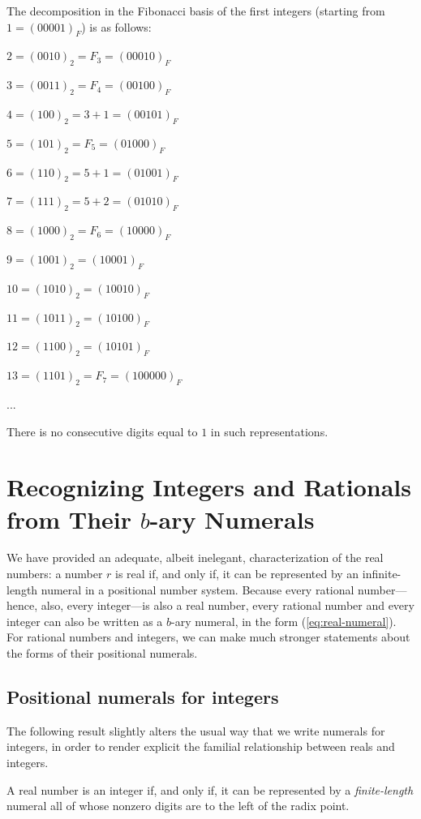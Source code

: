 The decomposition in the Fibonacci basis of the first integers (starting from $1 = (00001)_F$) is as follows:

 $2 = (0010)_2 = F_3 = (00010)_F$
 
 $3 = (0011)_2 = F_4 = (00100)_F$
  
 $4 = (100)_2 = 3+1 = (00101)_F$
 
 $5 = (101)_2 = F_5 = (01000)_F$
 
 $6 = (110)_2 = 5+1 = (01001)_F$
 
 $7 = (111)_2 = 5+2 = (01010)_F$
 
 $8 = (1000)_2 = F_6 = (10000)_F$
 
 $9 = (1001)_2 = (10001)_F$
 
 $10 = (1010)_2 = (10010)_F$
 
 $11 = (1011)_2 = (10100)_F$
 
 $12 = (1100)_2 = (10101)_F$
 
 $13 = (1101)_2 = F_7 =(100000)_F$
 
 ...
 
There is no consecutive digits equal to $1$ in such representations.


\section{Recognizing Integers and  Rationals from Their $b$-ary Numerals}
\label{sec:special-numerals-N-Q}

We have provided an adequate, albeit inelegant, characterization of
the real numbers: a number $r$ is real if, and only if, it can be
represented by an infinite-length numeral in a positional number
system.  Because every rational number---hence, also, every
integer---is also a real number, every rational number and every
integer can also be written as a $b$-ary numeral, in the form
(\ref{eq:real-numeral}).  For rational numbers and integers, we can
make much stronger statements about the forms of their positional
numerals.


\subsection{Positional numerals for integers}
\label{sec:special-numerals-N}

The following result slightly alters the usual way that we write
numerals for integers, in order to render explicit the familial
relationship between reals and integers.

\begin{prop}
\label{thm:integer-real}
A real number is an integer if, and only if, it can be represented by
a {\em finite-length} numeral all of whose nonzero digits are to the
left of the radix point.
\end{prop}

